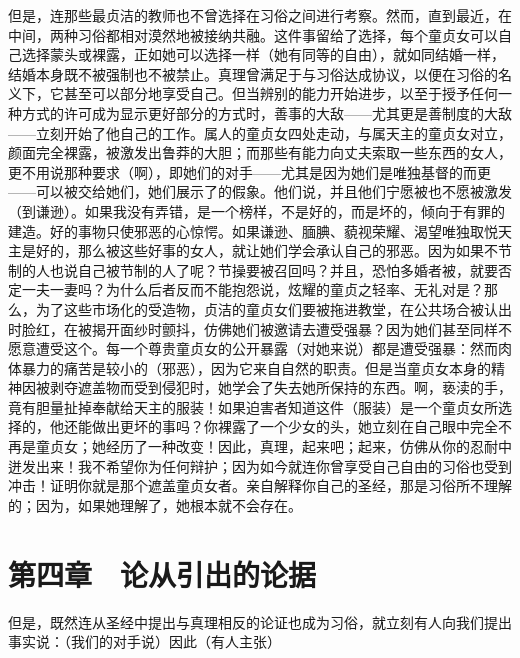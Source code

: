 但是，连那些最贞洁的教师也不曾选择在习俗之间进行考察。然而，直到最近，在中间，两种习俗都相对漠然地被接纳共融。这件事留给了选择，每个童贞女可以自己选择蒙头或裸露，正如她可以选择一样（她有同等的自由），就如同结婚一样，结婚本身既不被强制也不被禁止。真理曾满足于与习俗达成协议，以便在习俗的名义下，它甚至可以部分地享受自己。但当辨别的能力开始进步，以至于授予任何一种方式的许可成为显示更好部分的方式时，善事的大敌——尤其更是善制度的大敌——立刻开始了他自己的工作。属人的童贞女四处走动，与属天主的童贞女对立，颜面完全裸露，被激发出鲁莽的大胆；而那些有能力向丈夫索取一些东西的女人，更不用说那种要求（啊），即她们的对手——尤其是因为她们是唯独基督的而更——可以被交给她们，她们展示了的假象。他们说，并且他们宁愿被也不愿被激发（到谦逊）。如果我没有弄错，是一个榜样，不是好的，而是坏的，倾向于有罪的建造。好的事物只使邪恶的心惊愕。如果谦逊、腼腆、藐视荣耀、渴望唯独取悦天主是好的，那么被这些好事的女人，就让她们学会承认自己的邪恶。因为如果不节制的人也说自己被节制的人了呢？节操要被召回吗？并且，恐怕多婚者被，就要否定一夫一妻吗？为什么后者反而不能抱怨说，炫耀的童贞之轻率、无礼对是？那么，为了这些市场化的受造物，贞洁的童贞女们要被拖进教堂，在公共场合被认出时脸红，在被揭开面纱时颤抖，仿佛她们被邀请去遭受强暴？因为她们甚至同样不愿意遭受这个。每一个尊贵童贞女的公开暴露（对她来说）都是遭受强暴：然而肉体暴力的痛苦是较小的（邪恶），因为它来自自然的职责。但是当童贞女本身的精神因被剥夺遮盖物而受到侵犯时，她学会了失去她所保持的东西。啊，亵渎的手，竟有胆量扯掉奉献给天主的服装！如果迫害者知道这件（服装）是一个童贞女所选择的，他还能做出更坏的事吗？你裸露了一个少女的头，她立刻在自己眼中完全不再是童贞女；她经历了一种改变！因此，真理，起来吧；起来，仿佛从你的忍耐中迸发出来！我不希望你为任何辩护；因为如今就连你曾享受自己自由的习俗也受到冲击！证明你就是那个遮盖童贞女者。亲自解释你自己的圣经，那是习俗所不理解的；因为，如果她理解了，她根本就不会存在。\par


\section{第四章　论从引出的论据}

但是，既然连从圣经中提出与真理相反的论证也成为习俗，就立刻有人向我们提出事实说：（我们的对手说）因此（有人主张）\par

